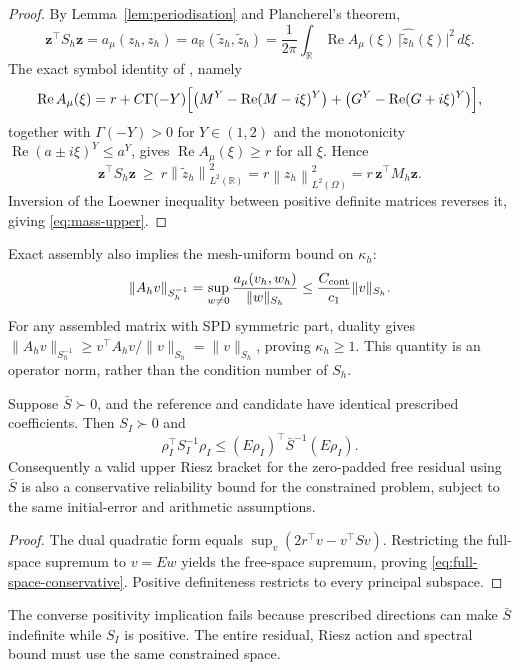 \documentclass[supplement,hidelinks]{siamart251216}
\newcommand{\R}{\mathbb{R}}
\newcommand{\Mh}{M_h}
\newcommand{\Ah}{A_h}
\newcommand{\Sh}{S_h}
\newcommand{\norm}[1]{\left\lVert #1\right\rVert}
\newcommand{\zz}{\mathbf z}
\newcommand{\rf}{r}
\DeclareMathOperator{\Real}{Re}
\begin{document}
\begin{proof}
By Lemma~\ref{lem:periodisation} and Plancherel's theorem,
\[
  \zz^\top\Sh\zz=a_\mu(z_h,z_h)=a_\R(\widetilde z_h,\widetilde z_h)
  =\frac1{2\pi}\int_\R\Real A_\mu(\xi)\,\bigl|\widehat{\widetilde z_h}(\xi)\bigr|^2\,d\xi .
\]
The exact symbol identity of \cite{DamircheliCGMY2026}, namely
\begin{equation}
\Real A_\mu(\xi)
=\rf+C\Gamma(-Y)\Bigl[\bigl(M^Y-\Real(M-i\xi)^Y\bigr)
+\bigl(G^Y-\Real(G+i\xi)^Y\bigr)\Bigr],
\label{eq:symbol-real-exact}
\end{equation}
together with $\Gamma(-Y)>0$ for $Y\in(1,2)$ and the monotonicity
$\Real(a\pm i\xi)^Y\le a^Y$, gives $\Real A_\mu(\xi)\ge \rf$ for all $\xi$.  Hence
\[
  \zz^\top\Sh\zz\ \ge\ \rf\norm{\widetilde z_h}^2_{L^2(\R)}
  =\rf\norm{z_h}^2_{L^2(\Omega)}=\rf\,\zz^\top\Mh\zz .
\]
Inversion of the Loewner
inequality between positive definite matrices reverses it, giving
\eqref{eq:mass-upper}.
\end{proof}
Exact assembly also implies the mesh-uniform bound on $\kappa_h$:
\[
 \|\Ah v\|_{\Sh^{-1}}
 =\sup_{w\ne0}\frac{a_\mu(v_h,w_h)}{\|w\|_{\Sh}}
 \le\frac{C_{\rm cont}}{c_1}\|v\|_{\Sh}.
\]
For any assembled matrix with SPD symmetric part, duality gives
$\|\Ah v\|_{\Sh^{-1}}\ge v^\top\Ah v/\|v\|_{\Sh}=\|v\|_{\Sh}$,
proving $\kappa_h\ge1$. This quantity is an operator norm, rather than the
condition number of $\Sh$.
\begin{proposition}
\label{prop:full-space-conservative}
Suppose $\bar S\succ0$, and the reference and candidate have identical
prescribed coefficients. Then $S_I\succ0$ and
\begin{equation}
 \rho_I^\top S_I^{-1}\rho_I
 \le (E\rho_I)^\top\bar S^{-1}(E\rho_I).
 \label{eq:full-space-conservative}
\end{equation}
Consequently a valid upper Riesz bracket for the zero-padded free residual
using $\bar S$ is also a conservative reliability bound for the constrained
problem, subject to the same initial-error and arithmetic assumptions.
\end{proposition}
\begin{proof}
The dual quadratic form equals
$\sup_v(2r^\top v-v^\top S v)$. Restricting the full-space supremum to
$v=Ew$ yields the free-space supremum, proving
\eqref{eq:full-space-conservative}. Positive definiteness restricts to every
principal subspace.
\end{proof}
The converse positivity implication fails because prescribed directions
can make $\bar S$ indefinite while $S_I$ is positive. The entire residual,
Riesz action and spectral bound must use the same constrained space.
\end{document}
